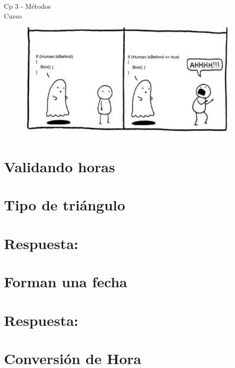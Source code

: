 \begin{center}
    \begin{large}
    Cp 3 - Métodos\\
    Curso \academicyear\\
    \end{large}
    \begin{figure}[h]
    	\centering
    	\includegraphics[width=0.6\linewidth]{cp3/conditional.jpg}
    \end{figure}
\end{center}

\section{Validando horas}


\section{Tipo de triángulo}

\ifshowanswers
\section*{Respuesta:}

\fi

\section{Forman una fecha}

\ifshowanswers
\section*{Respuesta:}

\fi

\section{Conversión de Hora} 


